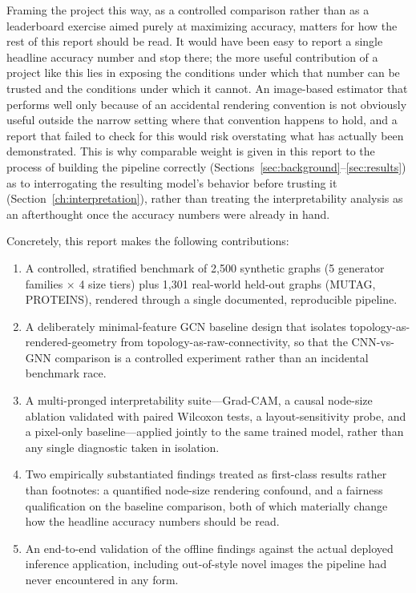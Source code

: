 \documentclass[11pt,letterpaper]{article}
\numberwithin{equation}{section}
\numberwithin{figure}{section}
\numberwithin{table}{section}
\begin{document}
Framing the project this way, as a controlled comparison rather than as a leaderboard exercise aimed purely at maximizing accuracy, matters for how the rest of this report should be read. It would have been easy to report a single headline accuracy number and stop there; the more useful contribution of a project like this lies in exposing the conditions under which that number can be trusted and the conditions under which it cannot. An image-based estimator that performs well only because of an accidental rendering convention is not obviously useful outside the narrow setting where that convention happens to hold, and a report that failed to check for this would risk overstating what has actually been demonstrated. This is why comparable weight is given in this report to the process of building the pipeline correctly (Sections~\ref{sec:background}--\ref{sec:results}) as to interrogating the resulting model's behavior before trusting it (Section~\ref{ch:interpretation}), rather than treating the interpretability analysis as an afterthought once the accuracy numbers were already in hand.

Concretely, this report makes the following contributions:
\begin{enumerate}[leftmargin=18pt, itemsep=3pt]
    \item A controlled, stratified benchmark of 2,500 synthetic graphs (5 generator families $\times$ 4 size tiers) plus 1,301 real-world held-out graphs (MUTAG, PROTEINS), rendered through a single documented, reproducible pipeline.
    \item A deliberately minimal-feature GCN baseline design that isolates topology-as-rendered-geometry from topology-as-raw-connectivity, so that the CNN-vs-GNN comparison is a controlled experiment rather than an incidental benchmark race.
    \item A multi-pronged interpretability suite---Grad-CAM, a causal node-size ablation validated with paired Wilcoxon tests, a layout-sensitivity probe, and a pixel-only baseline---applied jointly to the same trained model, rather than any single diagnostic taken in isolation.
    \item Two empirically substantiated findings treated as first-class results rather than footnotes: a quantified node-size rendering confound, and a fairness qualification on the baseline comparison, both of which materially change how the headline accuracy numbers should be read.
    \item An end-to-end validation of the offline findings against the actual deployed inference application, including out-of-style novel images the pipeline had never encountered in any form.
\end{enumerate}
\end{document}
